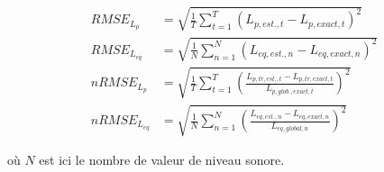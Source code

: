 \begin{subequations}\label{eq:erreurRMSE}
\begin{align}
RMSE_{L_p}& = \sqrt{\frac{1}{T}\sum_{t=1}^T \left(L_{p,est.,t}-L_{p,exact,t} \right)^2}\label{eq:erreurRMSE_Lp} \\
RMSE_{L_{eq}} &= \sqrt{\frac{1}{N}\sum_{n=1}^N \left(L_{eq,est., n}-L_{eq,exact,n} \right)^2} \label{eq:erreurRMSE_Leq} \\
nRMSE_{L_p}& = \sqrt{\frac{1}{T}\sum_{t=1}^T \left(\frac{L_{p,tr,est.,t}-L_{p,tr,exact,t}}{L_{p,glob.,exact,t}} \right)^2} \label{eq:erreurRMSE_normLp} \\
nRMSE_{L_{eq}} &= \sqrt{\frac{1}{N}\sum_{n=1}^N \left(\frac{L_{eq,est., n}-L_{eq,exact,n}}{L_{eq,global,n}} \right)^2} \label{eq:erreurRMSE_normLeq}
\end{align}
\end{subequations}

où $N$ est ici le nombre de valeur de niveau sonore. 


%